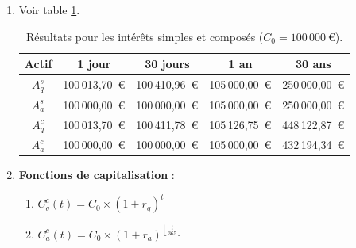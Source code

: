 \documentclass{article}
\begin{document}
\begin{enumerate}[label=\textbf{R2.\arabic*}]
                \item Voir table \ref{tab:compound_interest_results}.
                \begin{table}[h!]
                    \centering
                    \begin{tabular}{|c|c|c|c|c|}
                        \hline
                        \textbf{Actif} & \textbf{1 jour}  & \textbf{30 jours} & \textbf{1 an}    & \textbf{30 ans}  \\
                        \hline
                        \( A_q^s \)    & 100\,013,70\ € & 100\,410,96\ €  & 105\,000,00\ € & 250\,000,00\ € \\
                        \hline
                        \( A_a^s \)    & 100\,000,00\ € & 100\,000,00\ €  & 105\,000,00\ € & 250\,000,00\ € \\
                        \hline
                        \( A_q^c \)    & 100\,013,70\ € & 100\,411,78\ €  & 105\,126,75\ € & 448\,122,87\ € \\
                        \hline
                        \( A_a^c \)    & 100\,000,00\ € & 100\,000,00\ €  & 105\,000,00\ € & 432\,194,34\ € \\
                        \hline
                    \end{tabular}
                    \caption{Résultats pour les intérêts simples et composés (\( C_0 = 100\,000\ \text{€} \)).}
                    \label{tab:compound_interest_results}
                \end{table} 
                
                \item \textbf{Fonctions de capitalisation} :
                    \begin{enumerate}[label=(\alph*)]
                        \item \( C_q^c(t) = C_0 \times \left(1 + r_q \right)^t \)
                        \item \( C_a^c(t) = C_0 \times \left(1 + r_a \right)^{\left\lfloor\frac{t}{365}\right\rfloor} \)
                    \end{enumerate}
                    

\end{enumerate}
\end{document}
